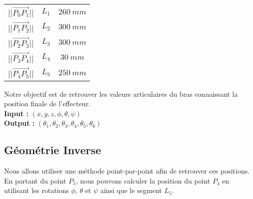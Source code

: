 \begin{center}
\end{center}

\begin{center}
  \begin{tabular}{c @{~=~} c @{~=~} c}
    ||$\overrightarrow{P_0P_1}$|| & $L_1$ & $260~mm$ \\
    ||$\overrightarrow{P_1P_2}$|| & $L_2$ & $300~mm$ \\
    ||$\overrightarrow{P_2P_3}$|| & $L_3$ & $300~mm$ \\
    ||$\overrightarrow{P_3P_4}$|| & $L_4$ & $30~mm$ \\
    ||$\overrightarrow{P_4P_5}$|| & $L_5$ & $250~mm$ \\
  \end{tabular}
\end{center}

Notre objectif est de retrouver les valeurs articulaires du bras connaissant la position finale de l'effecteur.\\
\textbf{Input : } $(x, y, z, \phi, \theta, \psi)$\\
\textbf{Output : } $(\theta_1, \theta_2, \theta_3, \theta_4, \theta_5, \theta_6)$
\newpage

\subsection{G\'eom\'etrie Inverse}
\label{sub:geominv}

Nous allons utiliser une m\'ethode point-par-point afin de retrouver ces positions.
En partant du point $P_5$, nous pouvons calculer la position du point $P_4$ en utilisant les rotations $\phi$, $\theta$ et $\psi$ ainsi que le segment $L_5$.

